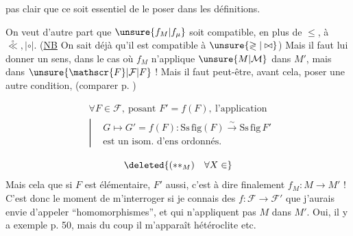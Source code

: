 pas clair que ce soit essentiel de le poser dans les définitions.

On veut d'autre part que $\unsure{f_M|f_\mu}$ soit compatible, en plus de $\leq$, à $\overset{\circ}{\ll},\mathrel{|\circ|}$. (\uline{NB} On sait déjà qu'il est compatible à $\unsure{\gtrless|\bowtie}$) Mais il faut lui donner un sens, dans le cas où  $f_M$ n'applique  $\unsure{M|\mathcal{M}}$ dans $M'$, mais dans $\unsure{\mathscr{F}|\mathcal{F}|F}$ ! Mais il faut peut-être, avant cela, poser une autre condition, (comparer p. )

\[
\begin{aligned}
&\forall F\in\mathscr{F},\ \text{posant }F'=f(F),\ \text{l'application}\\
&\left|\begin{aligned}&G\longmapsto G'=f(F):\mathrm{Ss\,fig}(F)\overset{\sim}{\longrightarrow}\mathrm{Ss\,fig}\,F'\\
&\text{est un isom. d'ens ordonnés.}
\end{aligned}\right.\end{aligned}\tag*{(**)}
\]

\[
\deleted{(**_M)\quad\forall X\in}
\]
Mais cela  que si $F$ est élémentaire, $F'$ aussi, c'est à dire finalement $f_M:M\longrightarrow M'$ ! C'est donc le moment de m'interroger si je connais des  $f:\mathscr{F}\longrightarrow\mathscr{F}'$ que j'aurais envie d'appeler ``homomorphismes'', et qui n'appliquent pas $M$ dans $M'$. Oui, il y a exemple  p. 50, mais du coup il m'apparaît hétéroclite etc.
